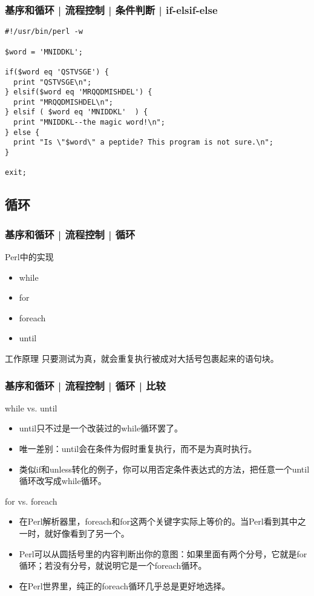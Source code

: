 \begin{frame}[fragile]
  \frametitle{基序和循环 | 流程控制 | 条件判断 | \alert{if-elsif-else}}
\begin{lstlisting}
#!/usr/bin/perl -w

$word = 'MNIDDKL';

if($word eq 'QSTVSGE') {
  print "QSTVSGE\n";
} elsif($word eq 'MRQQDMISHDEL') {
  print "MRQQDMISHDEL\n";
} elsif ( $word eq 'MNIDDKL'  ) {
  print "MNIDDKL--the magic word!\n";
} else {
  print "Is \"$word\" a peptide? This program is not sure.\n";
}

exit;
\end{lstlisting}
\end{frame}

\subsection{循环}
\begin{frame}
  \frametitle{基序和循环 | 流程控制 | 循环}
  \begin{block}{\alert{Perl中的实现}}
    \begin{itemize}
      \item while
      \item for
      \item foreach
      \item until
    \end{itemize}
  \end{block}
  \pause
  \begin{block}{工作原理}
    只要测试为真，就会重复执行被成对大括号包裹起来的语句块。
  \end{block}
\end{frame}

\begin{frame}
  \frametitle{基序和循环 | 流程控制 | 循环 | 比较}
  \begin{block}{while vs. until}
    \begin{itemize}
      \item until只不过是一个改装过的while循环罢了。
      \item 唯一差别：until会在条件为假时重复执行，而不是为真时执行。
      \item 类似if和unless转化的例子，你可以用否定条件表达式的方法，把任意一个until循环改写成while循环。
    \end{itemize}
  \end{block}
  \pause
  \begin{block}{for vs. foreach}
    \begin{itemize}
      \item 在Perl解析器里，foreach和for这两个关键字实际上等价的。当Perl看到其中之一时，就好像看到了另一个。
      \item Perl可以从圆括号里的内容判断出你的意图：如果里面有两个分号，它就是for循环；若没有分号，就说明它是一个foreach循环。
      \item 在Perl世界里，纯正的foreach循环几乎总是更好地选择。
    \end{itemize}
  \end{block}
\end{frame}

